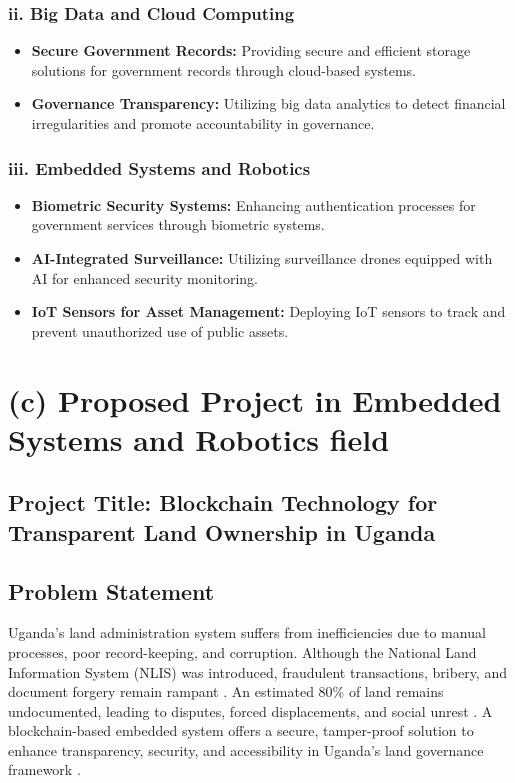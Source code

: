 \documentclass[11pt]{article}
\begin{document}
\subsubsection*{ii. Big Data and Cloud Computing}
\begin{itemize}
    \item \textbf{Secure Government Records:} Providing secure and efficient storage solutions for government records through cloud-based systems.
    \item \textbf{Governance Transparency:} Utilizing big data analytics to detect financial irregularities and promote accountability in governance.
\end{itemize}

\subsubsection*{iii. Embedded Systems and Robotics}
\begin{itemize}
    \item \textbf{Biometric Security Systems:} Enhancing authentication processes for government services through biometric systems.
    \item \textbf{AI-Integrated Surveillance:} Utilizing surveillance drones equipped with AI for enhanced security monitoring.
    \item \textbf{IoT Sensors for Asset Management:} Deploying IoT sensors to track and prevent unauthorized use of public assets.
\end{itemize}

\newpage
\section*{(c) Proposed Project in Embedded Systems and Robotics field}

\subsection*{Project Title: Blockchain Technology for Transparent Land Ownership in Uganda}

\subsection*{Problem Statement}
Uganda’s land administration system suffers from inefficiencies due to manual processes, poor record-keeping, and corruption. Although the National Land Information System (NLIS) was introduced, fraudulent transactions, bribery, and document forgery remain rampant \cite{rugadya2020}. An estimated 80\% of land remains undocumented, leading to disputes, forced displacements, and social unrest \cite{krigsholm2021}. A blockchain-based embedded system offers a secure, tamper-proof solution to enhance transparency, security, and accessibility in Uganda’s land governance framework \cite{ncube2022}.
\end{document}
